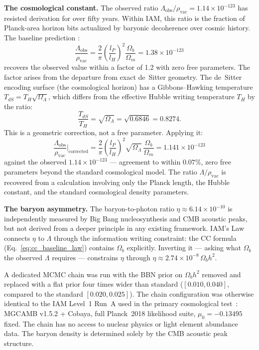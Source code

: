 \documentclass[12pt,a4paper]{article}
\begin{document}
\textbf{The cosmological constant.}
The observed ratio $\Lambda_\mathrm{obs}/\rho_\mathrm{vac} = 1.14
\times 10^{-123}$ has resisted derivation for over fifty years. Within
IAM, this ratio is the fraction of Planck-area horizon bits actualized
by baryonic decoherence over cosmic history. The baseline prediction
\citep{IAM_archive}:
\begin{equation}
\frac{\Lambda_\mathrm{obs}}{\rho_\mathrm{vac}} =
\frac{2}{\pi}\left(\frac{l_P}{l_H}\right)^2
\frac{\Omega_b}{\Omega_m}
= 1.38 \times 10^{-123}
\label{eq:cc_baseline_law}
\end{equation}
recovers the observed value within a factor of 1.2 with zero free
parameters. The factor arises from the departure from exact de~Sitter
geometry. The de~Sitter encoding surface (the cosmological horizon)
has a Gibbons--Hawking temperature $T_{dS} = T_H\sqrt{\Omega_\Lambda}$,
which differs from the effective Hubble writing temperature $T_H$ by
the ratio:
\begin{equation}
\frac{T_{dS}}{T_H} = \sqrt{\Omega_\Lambda} = \sqrt{0.6846} = 0.8274.
\label{eq:tdS_ratio}
\end{equation}
This is a geometric correction, not a free parameter. Applying it:
\begin{equation}
\frac{\Lambda_\mathrm{obs}}{\rho_\mathrm{vac}}\bigg|_\mathrm{corrected}
= \frac{2}{\pi}\left(\frac{l_P}{l_H}\right)^2
\sqrt{\Omega_\Lambda}\,\frac{\Omega_b}{\Omega_m}
= 1.141 \times 10^{-123}
\label{eq:cc_corrected_law}
\end{equation}
against the observed $1.14 \times 10^{-123}$ --- agreement to within
$0.07\%$, zero free parameters beyond the standard cosmological model.
The ratio $\Lambda/\rho_\mathrm{vac}$ is recovered from a calculation
involving only the Planck length, the Hubble constant, and the standard
cosmological density parameters.

\textbf{The baryon asymmetry.}
The baryon-to-photon ratio $\eta \approx 6.14 \times 10^{-10}$ is
independently measured by Big Bang nucleosynthesis and CMB acoustic
peaks, but not derived from a deeper principle in any existing
framework. IAM's Law connects $\eta$ to $\Lambda$ through the
information writing constraint: the CC formula
(Eq.~\ref{eq:cc_baseline_law}) contains $\Omega_b$ explicitly.
Inverting it --- asking what $\Omega_b$ the observed $\Lambda$ requires
--- constrains $\eta$ through $\eta \approx 2.74 \times 10^{-8}
\,\Omega_b h^2$.

A dedicated MCMC chain was run with the BBN prior on $\Omega_b h^2$
removed and replaced with a flat prior four times wider than standard
($[0.010, 0.040]$, compared to the standard $[0.020, 0.025]$). The
chain configuration was otherwise identical to the IAM Level~1 Run~A
used in the primary cosmological test~\citep{IAM_archive}: MGCAMB
v1.5.2 + Cobaya, full Planck~2018 likelihood suite, $\mu_0 = -0.13495$
fixed. The chain has no access to nuclear physics or light element
abundance data. The baryon density is determined solely by the CMB
acoustic peak structure.
\end{document}
